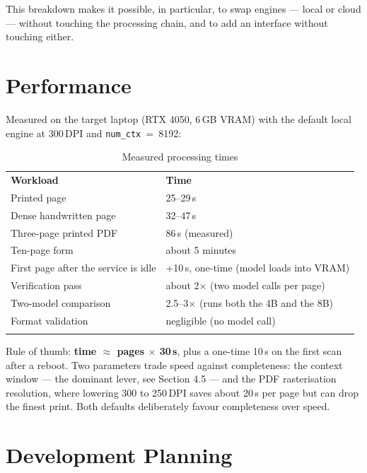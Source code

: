 \documentclass[11pt,a4paper]{article}
\newcommand{\toprule}{\noalign{\hrule height 0.9pt}\noalign{\vskip 3pt}}
\newcommand{\midrule}{\noalign{\vskip 3pt}\noalign{\hrule height 0.4pt}\noalign{\vskip 3pt}}
\newcommand{\bottomrule}{\noalign{\vskip 3pt}\noalign{\hrule height 0.9pt}}
\begin{document}
This breakdown makes it possible, in particular, to swap engines --- local or
cloud --- without touching the processing chain, and to add an interface
without touching either.

\section{Performance}

Measured on the target laptop (RTX 4050, 6\,GB VRAM) with the default local
engine at 300\,DPI and \texttt{num\_ctx}~=~8192:

\begin{table}[H]
\centering
\begin{tabular}{@{}L{7.4cm}L{6.6cm}@{}}
\toprule
\textbf{Workload} & \textbf{Time} \\
\midrule
Printed page & 25--29\,s \\
Dense handwritten page & 32--47\,s \\
Three-page printed PDF & 86\,s (measured) \\
Ten-page form & about 5 minutes \\
First page after the service is idle & +10\,s, one-time (model loads into VRAM) \\
Verification pass & about 2$\times$ (two model calls per page) \\
Two-model comparison & 2.5--3$\times$ (runs both the 4B and the 8B) \\
Format validation & negligible (no model call) \\
\bottomrule
\end{tabular}
\caption{Measured processing times}
\end{table}

Rule of thumb: \textbf{time $\approx$ pages $\times$ 30\,s}, plus a one-time
10\,s on the first scan after a reboot. Two parameters trade speed against
completeness: the context window --- the dominant lever, see Section 4.5 ---
and the PDF rasterisation resolution, where lowering 300 to 250\,DPI saves about
20\,s per page but can drop the finest print. Both defaults deliberately favour
completeness over speed.

\section{Development Planning}
\end{document}
